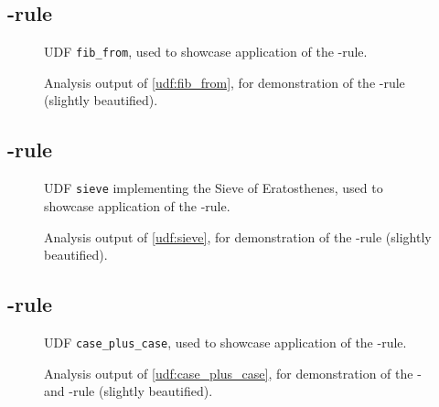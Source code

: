 \subsection{\RFROM-rule}
\begin{figure}[h!]
    \centering
    
    \caption{UDF \texttt{fib\_from}, used to showcase application of the \RFROM-rule.}
    \label{udf:fib_from}
\end{figure}

\begin{figure}[h!]
    \centering
    
    \caption{Analysis output of \autoref{udf:fib_from}, for demonstration of the \RFROM-rule (slightly beautified).}
    \label{scenarios:fib_from}
\end{figure}

\FloatBarrier
\subsection{\RWHERE-rule}
\begin{figure}[h!]
    \centering
    
    \caption{UDF \texttt{sieve} implementing the Sieve of Eratosthenes, used to showcase application of the \RWHERE-rule.}
    \label{udf:sieve}
\end{figure}

\begin{figure}[h!]
    \centering
    
    \caption{Analysis output of \autoref{udf:sieve}, for demonstration of the \RFROM-rule (slightly beautified).}
    \label{scenarios:sieve}
\end{figure}
\FloatBarrier

\subsection{\RCTE-rule}
\begin{figure}[h!]
    \centering
    
    \caption{UDF \texttt{case\_plus\_case}, used to showcase application of the \REXPR-rule.}
    \label{udf:fib_cte}
\end{figure}

\begin{figure}[h!]
    \centering
    
    \caption{Analysis output of \autoref{udf:case_plus_case}, for demonstration of the \RCTE- and \RWITH-rule (slightly beautified).}
    \label{scenarios:fib_cte}
\end{figure}
\FloatBarrier

